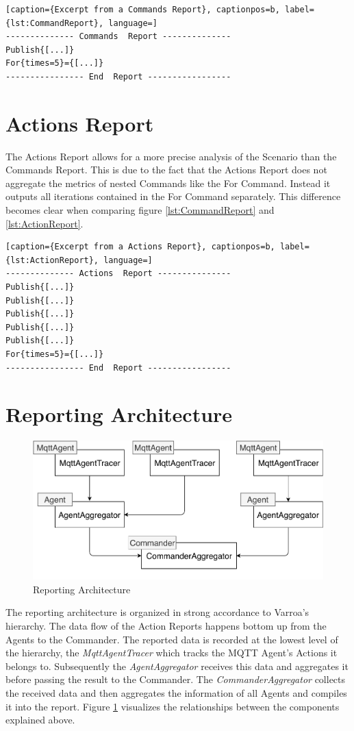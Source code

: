 \begin{lstlisting}[caption={Excerpt from a Commands Report}, captionpos=b, label={lst:CommandReport}, language=]
-------------- Commands  Report --------------
Publish{[...]}
For{times=5}={[...]}
---------------- End  Report -----------------
\end{lstlisting}

\section{Actions Report}\label{sec:actionsReport}
The Actions Report allows for a more precise analysis of the Scenario than the Commands Report.
This is due to the fact that the Actions Report does not aggregate the metrics of nested Commands like the For Command.
Instead it outputs all iterations contained in the For Command separately.
This difference becomes clear when comparing figure \ref{lst:CommandReport} and \ref{lst:ActionReport}.
\begin{lstlisting}[caption={Excerpt from a Actions Report}, captionpos=b, label={lst:ActionReport}, language=]
-------------- Actions  Report ---------------
Publish{[...]}
Publish{[...]}
Publish{[...]}
Publish{[...]}
Publish{[...]}
For{times=5}={[...]}
---------------- End  Report -----------------
\end{lstlisting}

\newpage
\section{Reporting Architecture}\label{sec:ReportingArchitecture}
\begin{figure}[H]
	\begin{center}
		\includegraphics[scale=0.75]{Resources/PDF/ReportingArchitecture}
		\caption{Reporting Architecture}
		\label{fig:ReportingArchitecture}
	\end{center}
\end{figure}
The reporting architecture is organized in strong accordance to Varroa's hierarchy.
The data flow of the Action Reports happens bottom up from the Agents to the Commander.
The reported data is recorded at the lowest level of the hierarchy, the \emph{MqttAgentTracer} which tracks the MQTT Agent's Actions it belongs to.
Subsequently the \emph{AgentAggregator} receives this data and aggregates it before passing the result to the Commander.
The \emph{CommanderAggregator} collects the received data and then aggregates the information of all Agents and compiles it into the report.
Figure \ref{fig:ReportingArchitecture} visualizes the relationships between the components explained above.

